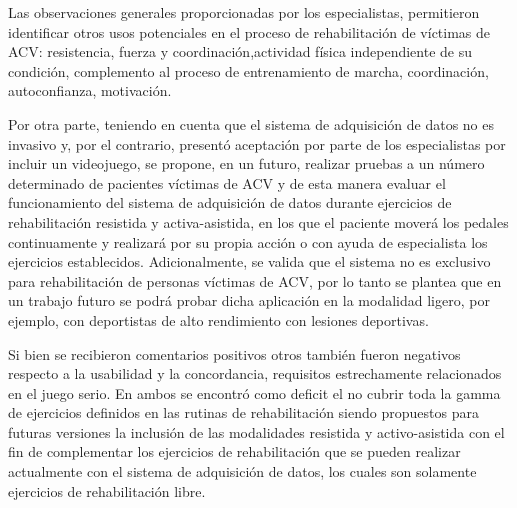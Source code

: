 Las observaciones generales proporcionadas por los especialistas, permitieron identificar otros usos potenciales en el proceso de rehabilitación de víctimas de ACV: resistencia, fuerza y coordinación,actividad física independiente de su condición, complemento al proceso de entrenamiento de marcha, coordinación, autoconfianza, motivación.

Por otra parte, teniendo en cuenta que el sistema de adquisición de datos no es invasivo y, por el contrario, presentó aceptación por parte de los especialistas por incluir un videojuego, se propone, en un futuro, realizar pruebas a un número determinado de pacientes víctimas de ACV y de esta manera evaluar el funcionamiento del sistema de adquisición de datos durante ejercicios de rehabilitación resistida y activa-asistida, en los que el paciente moverá los pedales continuamente y realizará por su propia acción o con ayuda de especialista los ejercicios establecidos. Adicionalmente, se valida que el sistema no es exclusivo para rehabilitación de personas víctimas de ACV, por lo tanto se plantea que en un trabajo futuro se podrá probar dicha aplicación en la modalidad ligero, por ejemplo, con deportistas de alto rendimiento con lesiones deportivas.

Si bien se recibieron comentarios  positivos otros también fueron negativos respecto a la usabilidad y la concordancia, requisitos estrechamente relacionados en el juego serio. En ambos se encontró como deficit el no cubrir toda la gamma de ejercicios definidos en las rutinas de rehabilitación siendo propuestos para futuras versiones la inclusión de las modalidades resistida y activo-asistida con el fin de complementar los ejercicios de rehabilitación que se pueden realizar actualmente con el sistema de adquisición de datos, los cuales son solamente ejercicios de rehabilitación libre.
